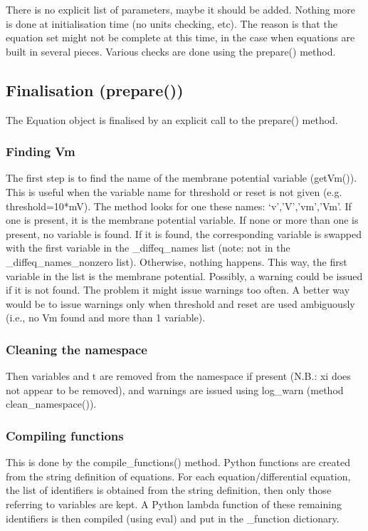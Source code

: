 \documentclass[letterpaper,10pt,english]{manual}
\begin{document}
There is no explicit list of parameters, maybe it should be added.
Nothing more is done at initialisation time (no units checking, etc).
The reason is that the equation set might not be complete at this time, in the case when
equations are built in several pieces. Various checks are done using the prepare() method.


\subsection{Finalisation (prepare())}

The Equation object is finalised by an explicit call to the prepare() method.


\subsubsection{Finding Vm}

The first step is to find the name of the membrane potential variable (getVm()).
This is useful when the variable name for threshold or reset is not given (e.g. threshold=10*mV).
The method looks for one these names: `v','V','vm','Vm'. If one is present, it is the
membrane potential variable. If none or more than one is present, no variable is found.
If it is found, the corresponding variable is swapped with the first variable in the
\_diffeq\_names list (note: not in the \_diffeq\_names\_nonzero list). Otherwise, nothing happens.
This way, the first variable in the list is the membrane potential.
Possibly, a warning could be issued if it is not found. The problem it might issue
warnings too often. A better way would be to issue warnings only when threshold and reset
are used ambiguously (i.e., no Vm found and more than 1 variable).


\subsubsection{Cleaning the namespace}

Then variables and t are removed from the namespace if present (N.B.: xi does not appear to be
removed), and warnings are issued using log\_warn (method clean\_namespace()).


\subsubsection{Compiling functions}

This is done by the compile\_functions() method.
Python functions are created from the string definition of equations.
For each equation/differential equation, the list of identifiers is obtained from the string definition,
then only those referring to variables are kept. A Python lambda function of these remaining identifiers is then
compiled (using eval) and put in the \_function dictionary.
\end{document}
